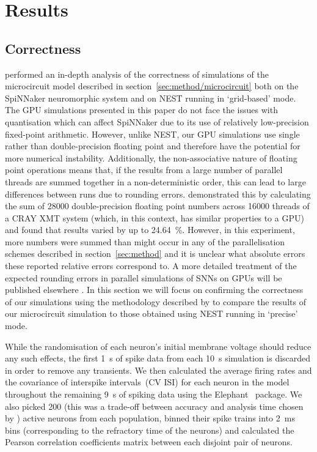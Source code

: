 \documentclass[utf8]{frontiersSCNS} %
\begin{document}
\section{Results}
\subsection{Correctness}
\label{sec:results/correctness}
\citet{VanAlbada2018} performed an in-depth analysis of the correctness of simulations of the microcircuit model described in section~\ref{sec:method/microcircuit} \citep{Potjans2012}  both on the SpiNNaker neuromorphic system and on NEST running in `grid-based' mode.
The GPU simulations presented in this paper do not face the issues with quantisation which can affect SpiNNaker due to its use of relatively low-precision fixed-point arithmetic.
However, unlike NEST, our GPU simulations use single rather than double-precision floating point and therefore have the potential for more numerical instability.
Additionally, the non-associative nature of floating point operations means that, if the results from a large number of parallel threads are summed together in a non-deterministic order, this can lead to large differences between runs due to rounding errors.
\citet{Villa2009} demonstrated this by calculating the sum of \num{28000} double-precision floating point numbers across \num{16000} threads of a CRAY XMT system (which, in this context, has similar properties to a GPU) and found that results varied by up to \SI{24.64}{\percent}.
However, in this experiment, more numbers were summed than might occur in any of the parallelisation schemes described in section~\ref{sec:method} and it is unclear what absolute errors these reported relative errors correspond to. A more detailed treatment of the expected rounding errors in parallel simulations of SNNs on GPUs will be published elsewhere \citep{Turner2019}. In this section we will focus on confirming the correctness of our simulations using the methodology described by \citet{VanAlbada2018} to compare the results of our microcircuit simulation to those obtained using NEST running in `precise' mode.

While the randomisation of each neuron's initial membrane voltage should reduce any such effects, the first \SI{1}{\second} of spike data from each \SI{10}{\second} simulation is discarded in order to remove any transients.
We then calculated the average firing rates and the covariance of interspike intervals~(CV ISI) for each neuron in the model throughout the remaining \SI{9}{\second} of spiking data using the Elephant~\citep{Yegenoglu2018} package.
We also picked \num{200} (this was a trade-off between accuracy and analysis time chosen by \citeauthor{VanAlbada2018}) active neurons from each population, binned their spike trains into \SI{2}{\milli\second} bins (corresponding to the refractory time of the neurons) and calculated the Pearson correlation coefficients matrix between each disjoint pair of neurons.
\end{document}
